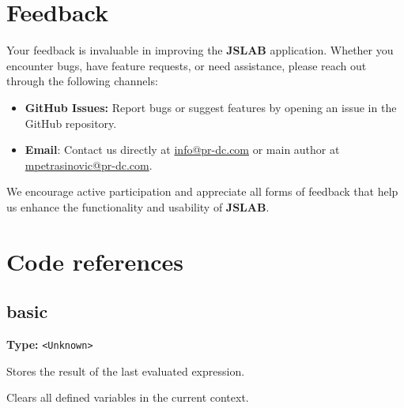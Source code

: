 \documentclass[12pt,a4paper]{article}
\begin{document}
\section{Feedback}

Your feedback is invaluable in improving the \textbf{JSLAB} application. Whether you encounter bugs, have feature requests, or need assistance, please reach out through the following channels:

\begin{itemize}
    \item \textbf{GitHub Issues:} Report bugs or suggest features by opening an issue in the GitHub repository.
    
    \item \textbf{Email}: Contact us directly at \href{mailto:info@pr-dc.com}{info@pr-dc.com} or main author at \href{mailto:mpetrasinovic@pr-dc.com}{mpetrasinovic@pr-dc.com}.
\end{itemize}

We encourage active participation and appreciate all forms of feedback that help us enhance the functionality and usability of \textbf{JSLAB}.

\section{Code references}

\subsection{basic}
\vspace{5mm}
\noindent {}\vspace{4mm}


\noindent \textbf{Type:} \texttt{<Unknown>}

\noindent Stores the result of the last evaluated expression.

\vspace{5mm}
\noindent {}


\noindent Clears all defined variables in the current context.

\vspace{5mm}
\noindent {}
\end{document}
